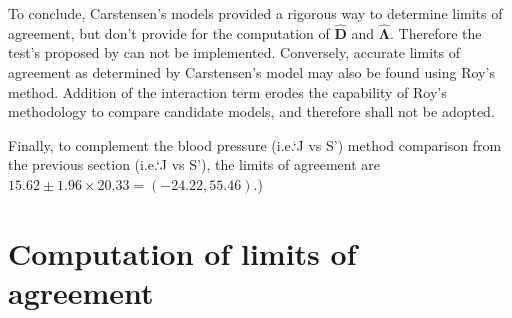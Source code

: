 \documentclass[12pt, a4paper]{report}
\theoremstyle{plain}
\theoremstyle{definition}
\theoremstyle{remark}
\begin{document}
To conclude, Carstensen's models provided a rigorous way to determine limits of agreement, but don't provide for the computation of $\boldsymbol{\hat{D}}$ and $\boldsymbol{\hat{\Lambda}}$. Therefore the test's proposed by \citet{roy} can not be implemented. Conversely, accurate limits of agreement as determined by Carstensen's model may also be found using Roy's method. Addition of the interaction term erodes the capability of Roy's methodology to compare candidate models, and therefore shall not be adopted.

Finally, to complement the blood pressure (i.e.`J vs S') method comparison from the previous section (i.e.`J vs S'), the limits of agreement are $15.62 \pm 1.96 \times 20.33 = (-24.22, 55.46)$.)



\section{Computation of limits of agreement }


\end{document}
